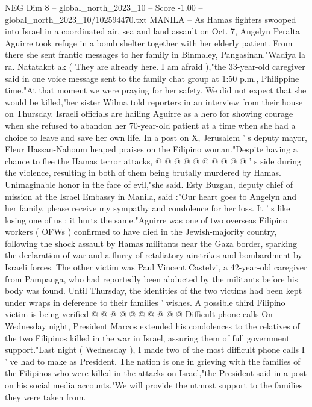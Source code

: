 \begin{textsample}{NEG Dim 8 – global\_north\_2023\_10 – Score -1.00 – global\_north\_2023\_10/102594470.txt}  \label{ex:f8_neg_220}
MANILA -- As Hamas fighters swooped into Israel in a coordinated air, sea and land assault on Oct. 7, Angelyn Peralta Aguirre took refuge in a bomb shelter together with her elderly patient.
From there she sent frantic messages to her family in Binmaley, Pangasinan."Wadiya la ra.
Natatakot ak ( They are already here.
I am afraid ),"the 33-year-old caregiver said in one voice message sent to the family chat group at 1:50 p.m., Philippine time."At that moment we were praying for her safety.
We did not expect that she would be killed,"her sister Wilma told reporters in an interview from their house on Thursday.
Israeli officials are hailing Aguirre as a hero for showing courage when she refused to abandon her 70-year-old patient at a time when she had a choice to leave and save her own life.
In a post on X, Jerusalem ' s deputy mayor, Fleur Hassan-Nahoum heaped praises on the Filipino woman."Despite having a chance to flee the Hamas terror attacks, @ @ @ @ @ @ @ @ @ @ ' s side during the violence, resulting in both of them being brutally murdered by Hamas.
Unimaginable honor in the face of evil,"she said.
Esty Buzgan, deputy chief of mission at the Israel Embassy in Manila, said :"Our heart goes to Angelyn and her family, please receive my sympathy and condolence for her loss.
It ' s like losing one of us ; it hurts the same."Aguirre was one of two overseas Filipino workers ( OFWs ) confirmed to have died in the Jewish-majority country, following the shock assault by Hamas militants near the Gaza border, sparking the declaration of war and a flurry of retaliatory airstrikes and bombardment by Israeli forces.
The other victim was Paul Vincent Castelvi, a 42-year-old caregiver from Pampanga, who had reportedly been abducted by the militants before his body was found.
Until Thursday, the identities of the two victims had been kept under wraps in deference to their families ' wishes.
A possible third Filipino victim is being verified @ @ @ @ @ @ @ @ @ @ Difficult phone calls On Wednesday night, President Marcos extended his condolences to the relatives of the two Filipinos killed in the war in Israel, assuring them of full government support."Last night ( Wednesday ), I made two of the most difficult phone calls I ' ve had to make as President.
The nation is one in grieving with the families of the Filipinos who were killed in the attacks on Israel,"the President said in a post on his social media accounts."We will provide the utmost support to the families they were taken from.

\end{textsample}
